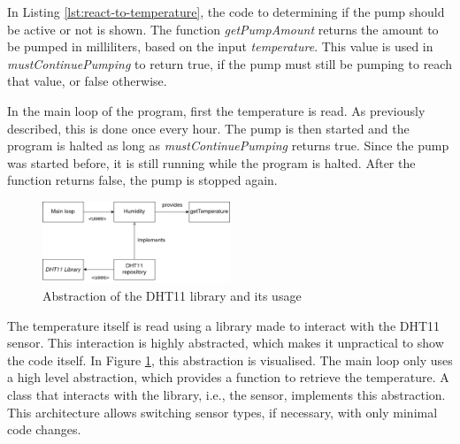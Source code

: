 In Listing \ref{lst:react-to-temperature}, the code to determining if the pump should be active or not is shown.
The function \textit{getPumpAmount} returns the amount to be pumped in milliliters, based on the input \textit{temperature}.
This value is used in \textit{mustContinuePumping} to return true, if the pump must still be pumping to reach that value, or false otherwise.

In the main loop of the program, first the temperature is read.
As previously described, this is done once every hour.
The pump is then started and the program is halted as long as \textit{mustContinuePumping} returns true.
Since the pump was started before, it is still running while the program is halted.
After the function returns false, the pump is stopped again.

\begin{figure}[h]
    \centering
    \includegraphics[width=0.5\textwidth]{img/humidity-architecture}
    \caption{Abstraction of the DHT11 library and its usage}
    \label{fig:abstraction-of-dht11}
\end{figure}

\newpage

The temperature itself is read using a library made to interact with the DHT11 sensor.
This interaction is highly abstracted, which makes it unpractical to show the code itself.
In Figure \ref{fig:abstraction-of-dht11}, this abstraction is visualised.
The main loop only uses a high level abstraction, which provides a function to retrieve the temperature.
A class that interacts with the library, i.e., the sensor, implements this abstraction.
This architecture allows switching sensor types, if necessary, with only minimal code changes.
